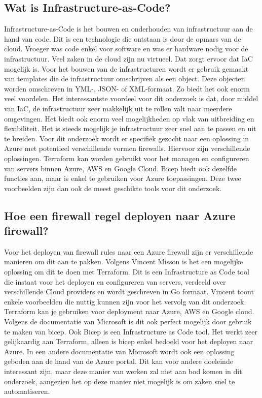 \subsection*{Wat is Infrastructure-as-Code?}
Infrastructure-as-Code is het bouwen en onderhouden van infrastructuur aan de hand van code. Dit is een technologie die ontstaan is door de opmars van de cloud. Vroeger was code enkel voor software en was er hardware nodig voor de infrastructuur. Veel zaken in de cloud zijn nu virtueel. Dat zorgt ervoor dat IaC mogelijk is. Voor het bouwen van de infrastructuren wordt er gebruik gemaakt van templates die de infrastructuur omschrijven als een object. Deze objecten worden omschreven in YML-, JSON- of XML-formaat. Zo biedt het ook enorm veel voordelen. Het interessantste voordeel voor dit onderzoek is dat, door middel van IaC, de infrastructuur zeer makkelijk uit te rollen valt naar meerdere omgevingen. \autocite{Bulthuis} Het biedt ook enorm veel mogelijkheden op vlak van uitbreiding en flexibiliteit. Het is steeds mogelijk je infrastructuur zeer snel aan te passen en uit te breiden. \autocite{Morris2016}  Voor dit onderzoek wordt er specifiek gezocht naar een oplossing in Azure met potentieel verschillende vormen firewalls. 
Hiervoor zijn verschillende oplossingen. Terraform kan worden gebruikt voor het managen en configureren van servers binnen Azure, AWS en Google Cloud. \autocite{IONOS2019} \autocite{Janashia2020} 
Bicep biedt ook dezelfde functies aan, maar is enkel te gebruiken voor Azure toepassingen. Deze twee voorbeelden zijn dan ook de meest geschikte tools voor dit onderzoek. \newline \autocite{Zerger} 


\subsection*{Hoe een firewall regel deployen naar Azure firewall?}

Voor het deployen van firewall rules naar een Azure firewall zijn er verschillende manieren om dit aan te pakken. 
Volgens Vincent Misson \autocite{Misson2021} is het een mogelijke oplossing om dit te doen met Terraform. Dit is een Infrastructure as Code tool die instaat voor het deployen en configureren van servers, verdeeld over verschillende Cloud providers en wordt geschreven in Go formaat. Vincent toont enkele voorbeelden die nuttig kunnen zijn voor het vervolg van dit onderzoek. Terraform kan je gebruiken voor deployment naar Azure, AWS en Google cloud. \autocite{Harrington2022} 
Volgens de documentatie van Microsoft \autocite{2022a} is dit ook perfect mogelijk door gebruik te maken van bicep. Ook Bicep is een Infrastructure as Code tool. Het werkt zeer gelijkaardig aan Terraform, alleen is bicep enkel bedoeld voor het deployen naar Azure. \autocite{Dave2021} 
In een andere documentatie van Microsoft \autocite{2022} wordt ook een oplossing geboden aan de hand van de Azure portal. Dit kan voor andere doeleinde interessant zijn, maar deze manier van werken zal niet aan bod komen in dit onderzoek, aangezien het op deze manier niet mogelijk is om zaken snel te automatiseren. 


